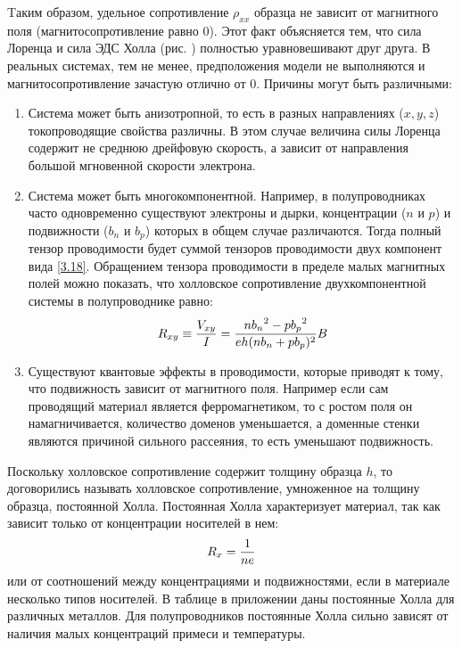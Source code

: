 Tаким образом, удельное сопротивление $\rho_{xx}$ образца не зависит от магнитного поля (магнитосопротивление равно 0). Этот факт объясняется тем, что сила Лоренца и сила ЭДС Холла (рис. ) полностью уравновешивают друг друга. В реальных системах, тем не менее, предположения модели не выполняются и магнитосопротивление зачастую отлично от 0. Причины могут быть различными:
\begin{enumerate}
\item{Система может быть анизотропной, то есть в разных направлениях ($x,y,z$) токопроводящие свойства различны. В этом случае величина силы Лоренца содержит не среднюю дрейфовую скорость, а зависит от направления большой мгновенной скорости электрона.}

\item{Система может быть многокомпонентной. Например, в полупроводниках часто одновременно существуют электроны и дырки, концентрации ($n$ и $p$) и подвижности ($b_n$ и $b_p$) которых в общем случае различаются. Тогда полный тензор проводимости будет суммой тензоров проводимости двух компонент вида \eqref{3.18}. Обращением тензора проводимости в пределе малых магнитных полей можно показать, что холловское сопротивление двухкомпонентной системы в полупроводнике равно:
\begin{equation}
	R_{xy}\equiv \frac{V_{xy}}{I}=\frac{n{b_n}^2-p{b_p}^2}{eh(nb_n+pb_p)^2}B
	\eqmark{3.21}
\end{equation}
}

\item{Существуют квантовые эффекты в проводимости, которые приводят к тому, что подвижность зависит от магнитного поля. Например если сам проводящий материал является ферромагнетиком, то с ростом поля он намагничивается, количество доменов уменьшается, а доменные стенки являются причиной сильного рассеяния, то есть уменьшают подвижность. }
\end{enumerate}

Поскольку холловское сопротивление содержит толщину образца $h$, то договорились называть холловское сопротивление, умноженное на толщину образца, постоянной Холла. Постоянная Холла характеризует материал, так как зависит только от концентрации носителей в нем:
\begin{equation}
	R_x=\frac{1}{ne}
	\eqmark{HallConstant}
\end{equation}
или от соотношений между концентрациями и подвижностями, если в материале несколько типов носителей. В таблице в приложении даны постоянные Холла для различных металлов. Для полупроводников постоянные Холла сильно зависят от наличия малых концентраций примеси и температуры.

